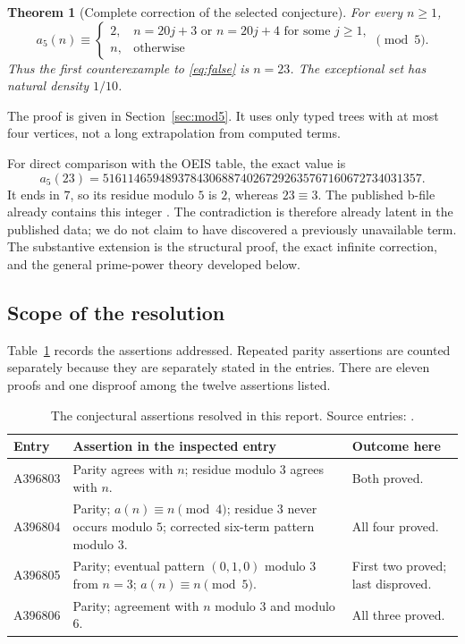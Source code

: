 \documentclass[11pt,letterpaper]{article}
\newtheorem{theorem}{Theorem}[section]
\theoremstyle{definition}
\theoremstyle{remark}
\begin{document}
\begin{theorem}[Complete correction of the selected conjecture]\label{thm:headline}
For every $n\ge1$,
\begin{equation}\label{eq:headline}
 a_5(n)\equiv
 \begin{cases}
 2,&n=20j+3\text{ or }n=20j+4\text{ for some }j\ge1,\\
 n,&\text{otherwise}
 \end{cases}\pmod5.
\end{equation}
Thus the first counterexample to \eqref{eq:false} is $n=23$.
The exceptional set has natural density $1/10$.
\end{theorem}
The proof is given in Section~\ref{sec:mod5}. It uses only typed trees with
at most four vertices, not a long extrapolation from computed terms.

For direct comparison with the OEIS table, the exact value is
\begin{equation}\label{eq:exact23}
 a_5(23)=516114659489378430688740267292635767160672734031357.
\end{equation}
It ends in $7$, so its residue modulo $5$ is $2$, whereas $23\equiv3$.
The published b-file already contains this integer \cite{bfile5}.
The contradiction is therefore already latent in the published data;
we do not claim to have discovered a previously unavailable term.
The substantive extension is the structural proof, the exact infinite
correction, and the general prime-power theory developed below.

\subsection{Scope of the resolution}
Table~\ref{tab:status} records the assertions addressed. Repeated parity
assertions are counted separately because they are separately stated in
the entries. There are eleven proofs and one disproof among the twelve
assertions listed.

\begin{table}[ht]
\centering\small
\begin{tabular}{@{}p{}p{}p{}@{}}
\toprule
Entry & Assertion in the inspected entry & Outcome here\\
\midrule
A396803 & Parity agrees with $n$; residue modulo $3$ agrees with $n$. & Both proved.\\
A396804 & Parity; $a(n)\equiv n\pmod4$; residue $3$ never occurs modulo $5$; corrected six-term pattern modulo $3$. & All four proved.\\
A396805 & Parity; eventual pattern $(0,1,0)$ modulo $3$ from $n=3$; $a(n)\equiv n\pmod5$. & First two proved; last disproved.\\
A396806 & Parity; agreement with $n$ modulo $3$ and modulo $6$. & All three proved.\\
\bottomrule
\end{tabular}
\caption{The conjectural assertions resolved in this report. Source entries:
\cite{oeis3,oeis4,oeis5,oeis6}.}\label{tab:status}
\end{table}
\end{document}
